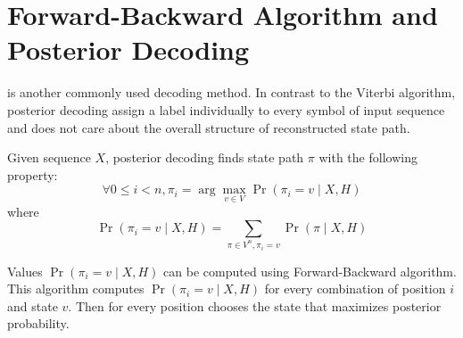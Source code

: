 \section{Forward-Backward Algorithm and Posterior Decoding}
 is another commonly used decoding method. In
contrast to the Viterbi algorithm, posterior decoding assign a label individually to
every symbol of input sequence and does not care about the overall structure of
reconstructed state path. 

Given sequence $X$, posterior decoding finds state path $\pi$ with the following
property:
\[\forall 0\leq i< n, \pi_i=\arg\max_{v\in V}\Pr\left(\pi_i=v\mid X,H\right) \]
where \[\Pr\left(\pi_i=v\mid X,H\right) = \sum_{\pi\in V^n,\pi_i=v}\Pr\left(\pi\mid X,H\right)\]

Values $\Pr\left(\pi_i=v\mid X,H\right)$ can be computed using Forward-Backward
algorithm. This algorithm computes $\Pr\left(\pi_i=v\mid X,H\right)$ for every
combination of position $i$ and state $v$. Then for every position chooses the
state that maximizes posterior probability.

